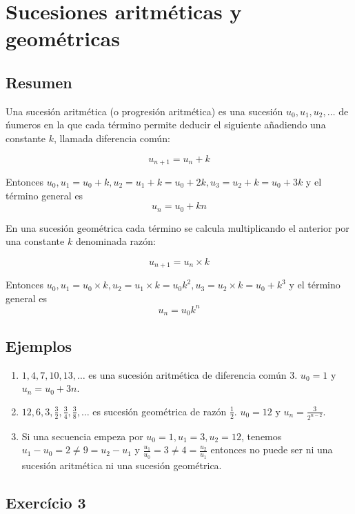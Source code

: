 \section{Sucesiones aritméticas y geométricas}

\subsection*{Resumen}

Una sucesión aritmética (o progresión aritmética) es una sucesión
$u_0, u_1, u_2, \ldots$ de ńumeros en la que cada término permite deducir el
siguiente añadiendo una constante $k$, llamada diferencia común:

$$u_{n+1} = u_n + k$$

Entonces $u_0, u_1 = u_0 + k, u_2 = u_1 + k = u_0 + 2k,
u_3 = u_2 + k = u_0 + 3k$ y el término general es
$$u_n = u_0 + {k n}$$

En una sucesión geométrica cada término se calcula multiplicando el anterior
por una constante $k$ denominada razón:

$$u_{n+1} = u_n \times k$$

Entonces $u_0, u_1 = u_0 \times k, u_2 = u_1 \times k = u_0 k^2,
u_3 = u_2 \times k = u_0 + k^3$ y el término general es
$$u_n = u_0 k^n$$

\subsection*{Ejemplos}

\begin{enumerate}
\item $1, 4, 7, 10, 13, \ldots$ es una sucesión aritmética de diferencia común $3$.
  $u_0 = 1$ y $u_n = u_0 + 3n$.
\item $12, 6, 3, \frac{3}{2}, \frac{3}{4}, \frac{3}{8}, \ldots$ es sucesión
  geométrica de razón $\frac{1}{2}$. $u_0 = 12$ y
  $u_n = \frac{3}{2^{n-2}}$.
\item Si una secuencia empeza por
  $u_0 = 1, u_1 = 3, u_2 = 12$, tenemos $u_1 - u_0 = 2 \neq 9 = u_2 - u_1$ y
  $\frac{u_1}{u_0} = 3 \neq 4 = \frac{u_2}{u_1}$ entonces no puede ser ni
  una sucesión aritmética ni una sucesión geométrica.
\end{enumerate}

\subsection*{Exercício 3}

